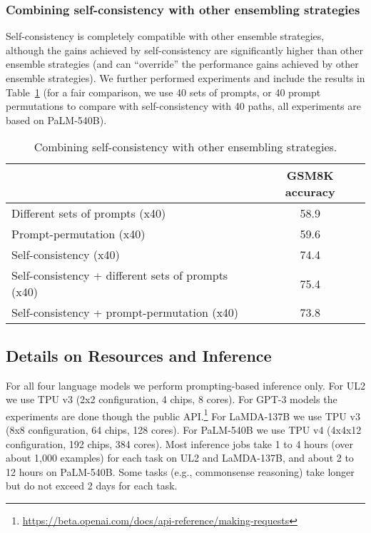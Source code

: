 \subsubsection{Combining self-consistency with other ensembling strategies}
\label{sec:combine}
Self-consistency is completely compatible with other ensemble strategies, although the gains achieved by self-consistency are significantly higher than other ensemble strategies (and can ``override'' the performance gains achieved by other ensemble strategies). We further performed experiments and include the results in Table~\ref{tab:combine} (for a fair comparison, we use 40 sets of prompts, or 40 prompt permutations to compare with self-consistency with 40 paths, all experiments are based on PaLM-540B).

\begin{table}[]
\small
    \centering
    \begin{tabular}{l c}
    \toprule
         &  GSM8K accuracy \\
         \midrule
        Different sets of prompts (x40) & 58.9\\
        Prompt-permutation (x40) & 59.6\\
        Self-consistency (x40) & 74.4 \\
        Self-consistency + different sets of prompts (x40) & 75.4\\
        Self-consistency + prompt-permutation (x40) & 73.8\\
        \bottomrule
    \end{tabular}
    \vspace{-0.1in}
    \caption{Combining self-consistency with other ensembling strategies.}
    \label{tab:combine}
\end{table}

\subsection{Details on Resources and Inference}
For all four language models we perform prompting-based inference only. 
For UL2 we use TPU v3 (2x2 configuration, 4 chips, 8 cores).
For GPT-3 models the experiments are done though the public API.\footnote{\url{https://beta.openai.com/docs/api-reference/making-requests}}
For LaMDA-137B we use TPU v3 (8x8 configuration, 64 chips, 128 cores).
For PaLM-540B we use TPU v4 (4x4x12 configuration, 192 chips, 384 cores). Most inference jobs take 1 to 4 hours (over about 1,000 examples) for each task on UL2 and LaMDA-137B, and about 2 to 12 hours on PaLM-540B. Some tasks (e.g., commonsense reasoning) take longer but do not exceed 2 days for each task.

